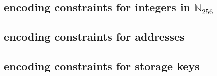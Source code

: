 \subsection{\rlp{} encoding constraints for integers in $\mathbb{N}_{256}$}                
\subsection{\rlp{} encoding constraints for addresses}                                     
\subsection{\rlp{} encoding constraints for storage keys}                                  
